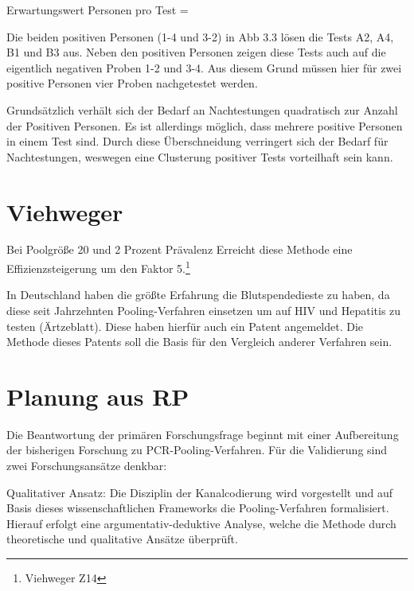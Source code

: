 Erwartungswert Personen pro Test =

Die beiden positiven Personen (1-4 und 3-2) in Abb 3.3 lösen die Tests A2, A4, B1 und B3 aus.
Neben den positiven Personen zeigen diese Tests auch auf die eigentlich negativen Proben 1-2 und 3-4.
Aus diesem Grund müssen hier für zwei positive Personen vier Proben nachgetestet werden.

Grundsätzlich verhält sich der Bedarf an Nachtestungen quadratisch zur Anzahl der Positiven Personen.
Es ist allerdings möglich, dass mehrere positive Personen in einem Test sind.
Durch diese Überschneidung verringert sich der Bedarf für Nachtestungen, weswegen eine Clusterung positiver Tests vorteilhaft sein kann.

\section{Viehweger}
Bei Poolgröße 20 und 2 Prozent Prävalenz Erreicht diese Methode eine Effizienzsteigerung um den Faktor 5.\footnote{Viehweger Z14}


In Deutschland haben die größte Erfahrung die Blutspendedieste zu haben, da diese seit Jahrzehnten Pooling-Verfahren einsetzen um auf HIV und Hepatitis zu testen (Ärtzeblatt). Diese haben hierfür auch ein Patent angemeldet. Die Methode dieses Patents soll die Basis für den Vergleich anderer Verfahren sein.




\section{Planung aus RP}
Die Beantwortung der primären Forschungsfrage beginnt mit einer Aufbereitung der bisherigen Forschung zu PCR-Pooling-Verfahren.
Für die Validierung sind zwei Forschungsansätze denkbar:

Qualitativer Ansatz:
Die Disziplin der Kanalcodierung wird vorgestellt und auf Basis dieses wissenschaftlichen Frameworks die Pooling-Verfahren formalisiert.
Hierauf erfolgt eine argumentativ-deduktive Analyse, welche die Methode durch theoretische und qualitative Ansätze überprüft.


